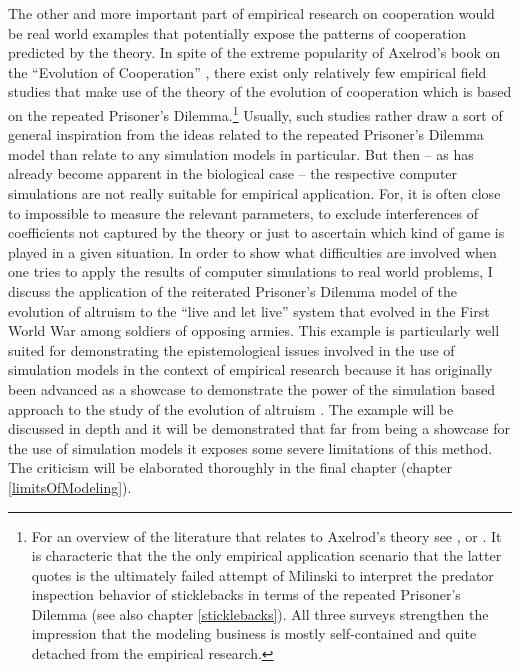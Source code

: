 The other and more important part of empirical research on cooperation would
be real world examples that potentially expose the patterns of cooperation
predicted by the theory. In spite of the extreme popularity of Axelrod's book
on the ``Evolution of Cooperation'' \cite[]{axelrod:1984}, there exist only
relatively few empirical field studies that make use of the theory of the
evolution of cooperation which is based on the repeated Prisoner's
Dilemma.\footnote{For an overview of the literature that relates to Axelrod's
  theory see \cite[]{axelrod-dambrosio:1994}, \cite[]{gotts-polhill-law:2003} or
\cite[]{hoffmann:2000}. It is characteric that the the only empirical 
application scenario that the latter quotes is the ultimately failed attempt of 
Milinski to interpret the predator inspection behavior of sticklebacks in terms of 
the repeated Prisoner's Dilemma (see also chapter \ref{sticklebacks}). All three surveys 
strengthen the impression that the modeling business is mostly self-contained and quite 
detached from the empirical research.} Usually, such studies rather
draw a sort of general inspiration from the ideas related to the repeated
Prisoner's Dilemma model than relate to any simulation models in
particular. But then -- as has already become apparent in the biological case
-- the respective computer simulations are not really suitable for empirical
application. For, it is often close to impossible to measure the relevant
parameters, to exclude interferences of coefficients not captured by the
theory or just to ascertain which kind of game is played in a given situation.
In order to show what difficulties are involved when one tries to apply the
results of computer simulations to real world problems, I discuss the
application of the reiterated Prisoner's Dilemma model of the evolution of
altruism to the ``live and let live'' system that evolved in the First World
War among soldiers of opposing armies.  This example is particularly well
suited for demonstrating the epistemological issues involved in the use of
simulation models in the context of empirical research because it has
originally been advanced as a showcase to demonstrate the power of the
simulation based approach to the study of the evolution of altruism \cite[p.
67-79]{axelrod:1984}. The example will be discussed in depth and it will be
demonstrated that far from being a showcase for the use of simulation models
it exposes some severe limitations of this method. The criticism will be
elaborated thoroughly in the final chapter (chapter \ref{limitsOfModeling}).


